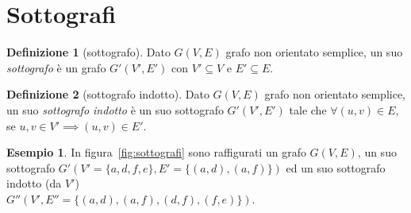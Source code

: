 \documentclass[a4paper, oneside, openany]{book}
\theoremstyle{plain}
\theoremstyle{definition}
\newtheorem{defn}{Definizione}[chapter]
\newtheorem{ese}{Esempio}[section]
\begin{document}
\section{Sottografi}
\begin{defn}[sottografo]
Dato  $G(V,E)$ grafo non orientato semplice, un suo \emph{sottografo} è un grafo
$G'(V',E')$ con $V' \subseteq V$ e $E' \subseteq E$.
\end{defn}

\begin{defn}[sottografo indotto]
Dato  $G(V,E)$ grafo non orientato semplice, un suo \emph{sottografo indotto} è un 
suo sottografo ${G'(V',E')}$ tale che ${\forall (u,v) \in E}$, se
${u,v \in V' \implies (u,v) \in E'}$.
\end{defn}

\begin{ese}
In figura~\ref{fig:sottografi} sono raffigurati un grafo ${G(V,E)}$, un suo sottografo
${G'(V' = \{a,d,f,e\}, E'= \{ (a,d), (a,f) \})}$ ed un suo sottografo indotto (da $V'$)\\
${G''(V', E''= \{ (a,d), (a,f), (d,f), (f,e) \})}$.
\begin{figure}[!ht]
    \centering
\end{figure}
\end{ese}
\end{document}
